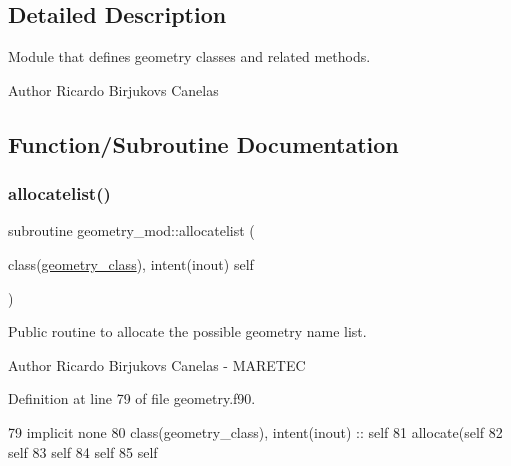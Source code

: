 \subsection{Detailed Description}
Module that defines geometry classes and related methods. 

\begin{DoxyAuthor}{Author}
Ricardo Birjukovs Canelas 
\end{DoxyAuthor}


\subsection{Function/\+Subroutine Documentation}
\mbox{\label{namespacegeometry__mod_a1b6f259b0b6be71e02ffae7670f7d8ba}} 
\subsubsection{\texorpdfstring{allocatelist()}{allocatelist()}}
{\footnotesize\ttfamily subroutine geometry\+\_\+mod\+::allocatelist (\begin{DoxyParamCaption}\item[{class(\mbox{\hyperlink{structgeometry__mod_1_1geometry__class}{geometry\+\_\+class}}), intent(inout)}]{self }\end{DoxyParamCaption})\hspace{0.3cm}{\ttfamily [private]}}



Public routine to allocate the possible geometry name list. 

\begin{DoxyAuthor}{Author}
Ricardo Birjukovs Canelas -\/ M\+A\+R\+E\+T\+EC 
\end{DoxyAuthor}


Definition at line 79 of file geometry.\+f90.


\begin{DoxyCode}
79     \textcolor{keywordtype}{implicit none}
80     \textcolor{keywordtype}{class}(geometry\_class), \textcolor{keywordtype}{intent(inout)} :: self
81     \textcolor{keyword}{allocate}(self%
82     self%
83     self%
84     self%
85     self%
\end{DoxyCode}
\mbox{\label{namespacegeometry__mod_ae87e4ecff2d21a839da2b82919b5fd0b}} 
